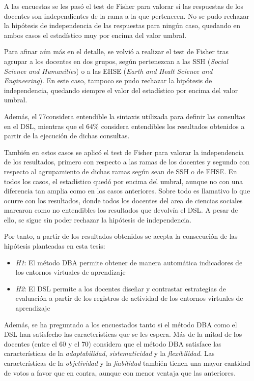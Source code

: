 A las encuestas se les pasó el test de Fisher para valorar si las respuestas de los docentes son independientes de la rama a la que pertenecen. No se pudo rechazar la hipótesis de independencia de las respuestas para ningún caso, quedando en ambos casos el estadístico muy por encima del valor umbral.

Para afinar aún más en el detalle, se volvió a realizar el test de Fisher tras agrupar a los docentes en dos grupos, según pertenezcan a las SSH (\emph{Social Science and Humanities}) o a las EHSE (\emph{Earth and Healt Science and Engineering}). En este caso, tampoco se pudo rechazar la hipótesis de independencia, quedando siempre el valor del estadístico por encima del valor umbral.

Además, el 77\percentage{ }considera entendible la sintaxis utilizada para definir las consultas en el DSL, mientras que el 64\% considera entendibles los resultados obtenidos a partir de la ejecución de dichas consultas.

También en estos casos se aplicó el test de Fisher para valorar la independencia de los resultados, primero con respecto a las ramas de los docentes y segundo con respecto al agrupamiento de dichas ramas según sean de SSH o de EHSE. En todos los casos, el estadístico quedó por encima del umbral, aunque no con una diferencia tan amplia como en los casos anteriores. Sobre todo es llamativo lo que ocurre con los resultados, donde todos los docentes del area de ciencias sociales marcaron como no entendibles los resultados que devolvía el DSL. A pesar de ello, se sigue sin poder rechazar la hipótesis de independencia.

Por tanto, a partir de los resultados obtenidos se acepta la consecución de las hipótesis planteadas en esta tesis:
\begin{itemize}
\item \emph{H1}: El método DBA permite obtener de manera automática indicadores de los entornos virtuales de aprendizaje
\item \emph{H2}: El DSL permite a los docentes diseñar y contrastar estrategias de evaluación a partir de los registros de actividad de los entornos virtuales de aprendizaje
\end{itemize}

Además, se ha preguntado a los encuestados tanto si el método DBA como el DSL han satisfecho las características que se les espera. Más de la mitad de los docentes (entre el 60 y el 70\percentage) considera que el método DBA satisface las características de la \emph{adaptabilidad}, \emph{sistematicidad} y la \emph{flexibilidad}. Las características de la \emph{objetividad} y la \emph{fiabilidad} también tienen una mayor cantidad de votos a favor que en contra, aunque con menor ventaja que las anteriores.

